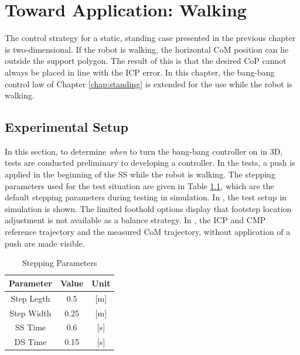 %
\chapter{Toward Application: Walking}\label{chap:walking}
The control strategy for a static, standing case presented in the previous chapter is two-dimensional. If the robot is walking, the horizontal \ac{CoM} position can lie outside the support polygon. The result of this is that the desired \ac{CoP} cannot always be placed in line with the \ac{ICP} error.  In this chapter, the bang-bang control law of Chapter \ref{chap:standing} is extended for the use while the robot is walking.
\section{Experimental Setup}
In this section, to determine \textit{when} to turn the bang-bang controller on in \ac{3D},  tests are conducted preliminary to developing a controller. In the tests, a push is applied in the beginning of the \ac{SS} while the robot is walking. The stepping parameters used for the test situation are given in Table \ref{tab:stepping}, which are the default stepping parameters during testing in simulation. In , the test setup in simulation is shown. The limited foothold options display that footstep location adjustment is not available as a balance strategy. In , the \ac{ICP} and \ac{CMP} reference trajectory and the measured \ac{CoM} trajectory, without application of a push are made visible. 
\begin{table}
\caption{Stepping Parameters} %
\centering %
\begin{tabular}{c c c } %
\hline\hline %
Parameter & Value & Unit \\
\hline %
Step Legth & 0.5 &  [m]\\
Step Width & 0.25 & [m]\\
\acs{SS} Time & 0.6 & [s]\\
\acs{DS} Time & 0.15 & [s]\\
\hline %
\end{tabular}
\label{tab:stepping} %
\end{table}
